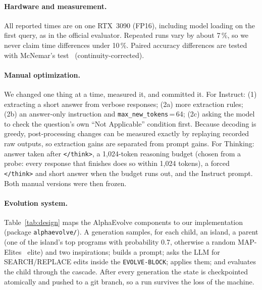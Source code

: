 \documentclass{article}
\begin{document}
\paragraph{Hardware and measurement.} All reported times are on one RTX~3090 (FP16), including model loading on the
first query, as in the official evaluator. Repeated runs vary by about 7\,\%, so we never claim time differences
under 10\,\%. Paired accuracy differences are tested with McNemar's test~\citep{mcnemar} (continuity-corrected).

\paragraph{Manual optimization.} We changed one thing at a time, measured it, and committed it. For Instruct:
(1) extracting a short answer from verbose responses; (2a) more extraction rules; (2b) an answer-only instruction and
\texttt{max\_new\_tokens}\,=\,64; (2c) asking the model to check the question's own ``Not Applicable'' condition first.
Because decoding is greedy, post-processing changes can be measured exactly by replaying recorded raw outputs, so
extraction gains are separated from prompt gains. For Thinking: answer taken after \texttt{</think>}, a 1{,}024-token
reasoning budget (chosen from a probe: every response that finishes does so within 1{,}024 tokens), a forced
\texttt{</think>} and short answer when the budget runs out, and the Instruct prompt. Both manual versions were then
frozen.

\paragraph{Evolution system.} Table~\ref{tab:design} maps the AlphaEvolve components to our implementation
(package \texttt{alphaevolve/}). A generation samples, for each child, an island, a parent (one of the island's top
programs with probability 0.7, otherwise a random MAP-Elites~\citep{mapelites} elite) and two inspirations; builds a
prompt; asks the LLM for SEARCH/REPLACE edits inside the \texttt{EVOLVE-BLOCK}; applies them; and evaluates the child
through the cascade. After every generation the state is checkpointed atomically and pushed to a git branch, so a
run survives the loss of the machine.
\end{document}
